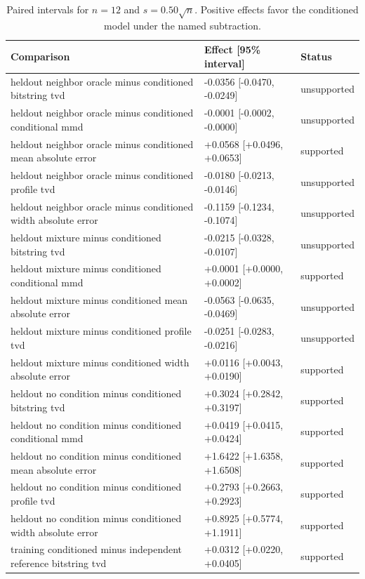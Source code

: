 \begin{table}[p]
\centering
\scriptsize
\setlength{\tabcolsep}{4pt}
\caption{Paired intervals for $n=12$ and $s=0.50\sqrt n$. Positive effects favor the conditioned model under the named subtraction.}
\label{tab:all-intervals-n12-w0.50}
\begin{tabular}{@{}p{}p{}p{}@{}}
\toprule
Comparison & Effect [95\% interval] & Status\\
\midrule
heldout neighbor oracle minus conditioned bitstring tvd & -0.0356 [-0.0470, -0.0249] & unsupported \\
heldout neighbor oracle minus conditioned conditional mmd & -0.0001 [-0.0002, -0.0000] & unsupported \\
heldout neighbor oracle minus conditioned mean absolute error & +0.0568 [+0.0496, +0.0653] & supported \\
heldout neighbor oracle minus conditioned profile tvd & -0.0180 [-0.0213, -0.0146] & unsupported \\
heldout neighbor oracle minus conditioned width absolute error & -0.1159 [-0.1234, -0.1074] & unsupported \\
heldout mixture minus conditioned bitstring tvd & -0.0215 [-0.0328, -0.0107] & unsupported \\
heldout mixture minus conditioned conditional mmd & +0.0001 [+0.0000, +0.0002] & supported \\
heldout mixture minus conditioned mean absolute error & -0.0563 [-0.0635, -0.0469] & unsupported \\
heldout mixture minus conditioned profile tvd & -0.0251 [-0.0283, -0.0216] & unsupported \\
heldout mixture minus conditioned width absolute error & +0.0116 [+0.0043, +0.0190] & supported \\
heldout no condition minus conditioned bitstring tvd & +0.3024 [+0.2842, +0.3197] & supported \\
heldout no condition minus conditioned conditional mmd & +0.0419 [+0.0415, +0.0424] & supported \\
heldout no condition minus conditioned mean absolute error & +1.6422 [+1.6358, +1.6508] & supported \\
heldout no condition minus conditioned profile tvd & +0.2793 [+0.2663, +0.2923] & supported \\
heldout no condition minus conditioned width absolute error & +0.8925 [+0.5774, +1.1911] & supported \\
training conditioned minus independent reference bitstring tvd & +0.0312 [+0.0220, +0.0405] & supported \\

\end{tabular}
\end{table}
